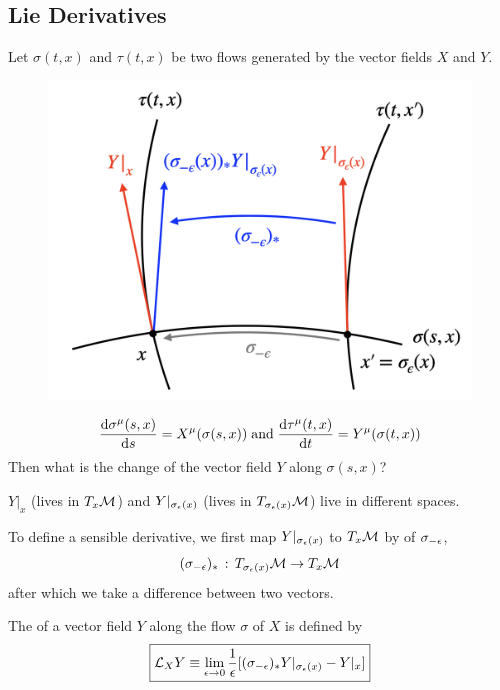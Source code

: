 \documentclass[a4paper, 10pt]{article}
\begin{document}
\subsection{Lie Derivatives}

\begin{obs}
    Let $\sigma(t,x)$ and $\tau(t, x)$ be two flows generated by the vector fields $X$ and $Y$.

    \begin{figure}[htbp]
        \centering
        \includegraphics[width=0.5\linewidth]{../images/lecture07/7_02.png}
    \end{figure}
    \[ \frac{\mathrm{d}\sigma^{\mu}(s, x)}{\mathrm{d}{s}} = X^{\mu}(\sigma(s,x)) \;\text{and}\; \frac{\mathrm{d}\tau^{\mu}(t, x)}{\mathrm{d}{t}} = Y^{\mu}(\sigma(t,x)) \]
    Then what is the change of the vector field $Y$ along $\sigma(s, x)$?

     $Y|_{x}$ (lives in $T_{x}\mathcal{M}$) and $Y|_{\sigma_{\epsilon}(x)}$ (lives in $T_{\sigma_{\epsilon}(x)}\mathcal{M}$) live in different spaces.

     To define a sensible derivative, we first map $Y|_{\sigma_{\epsilon}(x)}$ to $T_{x}\mathcal{M}$ by  of $\sigma_{-\epsilon}$,
    \[ (\sigma_{-\epsilon})_{\ast} \,:\, T_{\sigma_{\epsilon}(x)}\mathcal{M} \rightarrow T_{x}\mathcal{M} \]
    after which we take a difference between two vectors.
\end{obs}
\newpage


\begin{definition}
    The  of a vector field $Y$ along the flow $\sigma$ of $X$ is defined by
    \[ \boxed{\mathcal{L}_{X}Y \equiv \lim_{\epsilon \rightarrow 0}\frac{1}{\epsilon}[(\sigma_{-\epsilon})_{\ast}Y|_{\sigma_{\epsilon}(x)} - Y|_{x}]} \]
\end{definition}

\seprule
\end{document}
